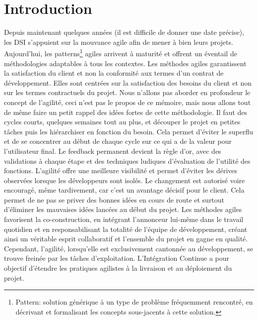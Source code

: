 \documentclass{report}
\begin{document}
    \section{Introduction}
    Depuis maintenant quelques années (il est difficile de donner une date précise), les DSI s’appuient sur la mouvance agile afin de mener à bien leurs projets. Aujourd’hui, les patterns\footnote{Pattern: solution générique à un type de problème fréquemment rencontré, en décrivant et formalisant les concepts sous-jacents à cette solution.} agiles arrivent à maturité et offrent un éventail de méthodologies adaptables à tous les contextes. Les méthodes agiles garantissent la satisfaction du client et non la conformité aux termes d’un contrat de développement. Elles sont centrées sur la satisfaction des besoins du client et non sur les termes contractuels du projet. Nous n’allons pas aborder en profondeur le concept de l’agilité, ceci n’est pas le propos de ce mémoire, mais nous allons tout de même faire un petit rappel des idées fortes de cette méthodologie. Il faut des cycles courts, quelques semaines tout au plus, et découper le projet en petites tâches puis les hiérarchiser en fonction du besoin. Cela permet d’éviter le superflu et de se concentrer au début de chaque cycle sur ce qui a de la valeur pour l’utilisateur final. Le feedback permanent devient la règle d’or, avec des validations à chaque étape et des techniques ludiques d’évaluation de l’utilité des fonctions. L’agilité offre une meilleure visibilité et permet d’éviter les dérives observées lorsque les développeurs sont isolés. Le changement est autorisé voire encouragé, même tardivement, car c’est un avantage décisif pour le client. Cela permet de ne pas se priver des bonnes idées en cours de route et surtout d’éliminer les mauvaises idées lancées au début du projet. Les méthodes agiles favorisent la co-construction, en intégrant l’annonceur lui-même dans le travail quotidien et en responsabilisant la totalité de l’équipe de développement, créant ainsi un véritable esprit collaboratif et l’ensemble du projet en gagne en qualité.\\

    Cependant, l’agilité, lorsqu’elle est exclusivement cantonnée au développement, se trouve freinée par les tâches d’exploitation. L'Intégration Continue a pour objectif d’étendre les pratiques agilistes à la livraison et au déploiement du projet.
\end{document}
